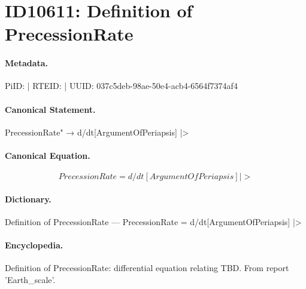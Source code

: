 \section*{ID10611: Definition of PrecessionRate}
\paragraph{Metadata.}
PiID:  | RTEID:  | UUID: 037c5deb-98ae-50e4-acb4-6564f7374af4

\paragraph{Canonical Statement.}
PrecessionRate" → d/dt[ArgumentOfPeriapsis] |>

\paragraph{Canonical Equation.}
\[
PrecessionRate = d/dt[ArgumentOfPeriapsis] |>
\]

\paragraph{Dictionary.}
Definition of PrecessionRate — PrecessionRate = d/dt[ArgumentOfPeriapsis] |>

\paragraph{Encyclopedia.}
Definition of PrecessionRate: differential equation relating TBD. From report 'Earth\_scale'.
